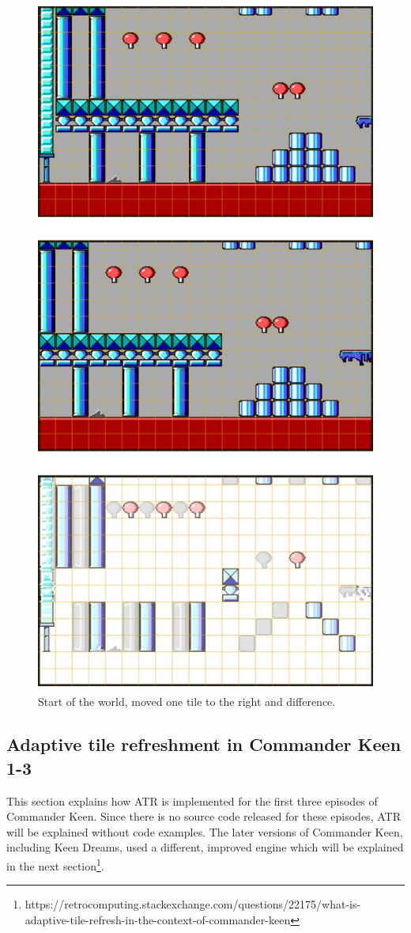 \documentclass[book.tex]{subfiles}
\begin{document}
\pagebreak
\begin{figure}[H] 
  \centering 
  \includegraphics[width=.66\textwidth]{screenshots_300dpi/game/keen-ATR-diff.png}
  \caption{Start of the world, moved one tile to the right and difference.}
  \label{fig:keen_difference}
\end{figure}
\pagebreak

\subsection{Adaptive tile refreshment in Commander Keen 1-3}
This section explains how ATR is implemented for the first three episodes of Commander Keen. Since there is no source code released for these episodes, ATR will be explained without code examples. The later versions of Commander Keen, including Keen Dreams, used a different, improved engine which will be explained in the next section\footnote{https://retrocomputing.stackexchange.com/questions/22175/what-is-adaptive-tile-refresh-in-the-context-of-commander-keen}.\\
\end{document}
